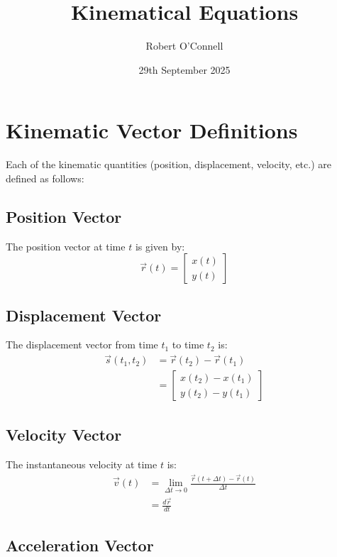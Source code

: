 \documentclass{article}
\title{\textbf{Kinematical Equations}}
\author{Robert O'Connell}
\date{29th September 2025}
\begin{document}
\maketitle

\section*{Kinematic Vector Definitions}

Each of the kinematic quantities (position, displacement, velocity, etc.) are defined as follows:

\subsection*{Position Vector}

The position vector at time $t$ is given by:
\[
\vec{r}(t) = \begin{bmatrix} x(t) \\ y(t) \end{bmatrix}
\]

\subsection*{Displacement Vector}

The displacement vector from time $t_1$ to time $t_2$ is:
\begin{align*}
\vec{s}(t_1, t_2) &= \vec{r}(t_2) - \vec{r}(t_1) \\
&= \begin{bmatrix} x(t_2) - x(t_1) \\ y(t_2) - y(t_1) \end{bmatrix}
\end{align*}

\subsection*{Velocity Vector}

The instantaneous velocity at time $t$ is:
\begin{align*}
\vec{v}(t) &= \lim_{\Delta t\to0}\frac{\vec{r}(t + \Delta t) - \vec{r}(t)}{\Delta t} \\
&= \frac{d\vec{r}}{dt}
\end{align*}

\subsection*{Acceleration Vector}
\end{document}
